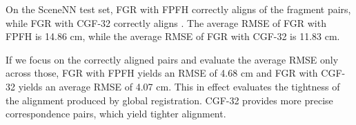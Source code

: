 On the SceneNN test set, FGR with FPFH correctly aligns  of the fragment pairs, while FGR with CGF-32 correctly aligns . The average RMSE of FGR with FPFH is 14.86 cm, while the average RMSE of FGR with CGF-32 is 11.83 cm.

If we focus on the correctly aligned pairs and evaluate the average RMSE only across those, FGR with FPFH yields an RMSE of 4.68 cm and FGR with CGF-32 yields an average RMSE of 4.07 cm. This in effect evaluates the tightness of the alignment produced by global registration. \mbox{CGF-32} provides more precise correspondence pairs, which yield tighter alignment.


\begin{comment}
      \begin{figure*}[!t]
      \centering
      \begin{minipage}{0.97\textwidth}
      \begin{tabular}{c c c c}
          \texttt{[image: render-source-shadowless.jpg]} &
          \texttt{[image: render-fpfh.jpg]} &
          \texttt{[image: render-shot.jpg]} &
          \texttt{[image: render-usc.jpg]}\\
           \small{(a) source} & \small{(b) FPFH } & \small{(c) SHOT} & \small{(d) USC} \\
          \texttt{[image: render-target-shadowless.jpg]} &
          \texttt{[image: render-pfh.jpg]} &
          \texttt{[image: render-spin.jpg]} &
          \texttt{[image: render-ours.jpg]} \\
          \small{(e) target} & \small{(f) PFH} & \small{(g) SI} & \small{(h) Ours}
      \end{tabular}
      \end{minipage}\hfill
      \begin{minipage}{0.03\textwidth}
      \texttt{[image: bar.pdf]}
      \end{minipage}
      \vspace{1mm}
      \caption{(a,e) Two fragments in the SceneNN test set. (b-d,f-h) Error magnitudes of correspondences established across these fragments in different feature spaces. Black corresponds to errors of 25 cm or higher. Points shown in grey do not have a ground-truth correspondence on the other fragment. Correspondences established in our feature space (h) are more precise on average. Note the thin structure above the large hole in the middle of the fragment, along which all other feature spaces fail to establish good correspondences.}
      \label{fig:scenenn-error}
      \end{figure*}
\end{comment}

